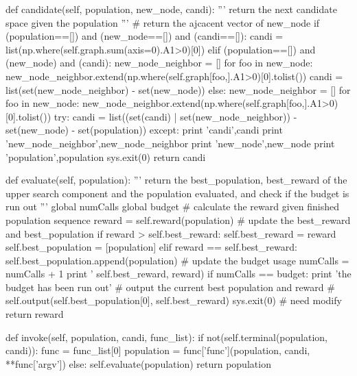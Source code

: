 \documentclass{article}
\begin{document}
\begin{python}[moreemph={[4]42},caption={A General Framework of MCTS based on Python},label=ex1]
    def candidate(self, population, new_node, candi):
        ''' return the next candidate space given the population '''
        # return the ajcacent vector of new_node
        if (population==[]) and (new_node==[]) and (candi==[]):
            candi = list(np.where(self.graph.sum(axis=0).A1>0)[0])
        elif (population==[]) and (new_node) and (candi):
            new_node_neighbor = []
            for foo in new_node:
                new_node_neighbor.extend(np.where(self.graph[foo,].A1>0)[0].tolist())
            candi = list(set(new_node_neighbor) - set(new_node))
        else:
            new_node_neighbor = []
            for foo in new_node:
                new_node_neighbor.extend(np.where(self.graph[foo,].A1>0)[0].tolist())
            try:
                candi = list((set(candi) | set(new_node_neighbor)) - set(new_node)
                        - set(population))
            except:
                print 'candi',candi
                print 'new_node_neighbor',new_node_neighbor
                print 'new_node',new_node
                print 'population',population
                sys.exit(0)
        return candi
        
    def evaluate(self, population):
        ''' return the best_population, best_reward of the upper search component
        and the population evaluated, and check if the budget is run out '''
        global numCalls
        global budget
        # calculate the reward given finished population sequence
        reward = self.reward(population)
        # update the best_reward and best_population
        if reward > self.best_reward:
            self.best_reward = reward
            self.best_population = [population]  
        elif reward == self.best_reward:
            self.best_population.append(population)
        # update the budget usage
        numCalls = numCalls + 1
        print '%
               self.best_reward, reward)
        if numCalls == budget:
            print 'the budget has been run out'
            # output the current best population and reward
            # self.output(self.best_population[0], self.best_reward)
            sys.exit(0) # need modify
        return reward
    
    def invoke(self, population, candi, func_list):
        if not(self.terminal(population, candi)):
            func = func_list[0]
            population = func['func'](population, candi, **func['argv'])
        else:
            self.evaluate(population)
        return population
    

\end{python}
\end{document}
